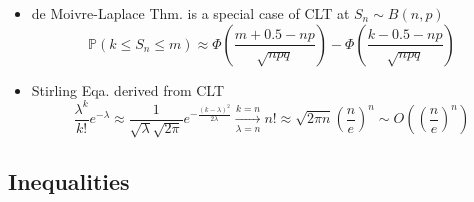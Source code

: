 \begin{itemize}
\begin{proof}
    Define $ Z=\dfrac{X-\mu }{\sigma } $ The taylor series of $ \phi _Z(t) $ at $ t=0 $ yields:
    \begin{align*}
        \phi _Z(t)=1-\dfrac{t^2}{2}+o(t^2) 
    \end{align*}
    The characteristic function of mean $ \displaystyle\bar{Z}:=\dfrac{1}{n}\sum_{i=1}^nZ_i=\dfrac{1}{n}\sum_{i=1}^n\dfrac{X_i-\mu }{\sigma } $ w.r.t. $ X_i $ i.i.d. $ \sim f_X(x) $
    \begin{align*}
        \phi _{\bar{Z}}(t)=\mathbb{E}\left[ e^{it\bar{Z}} \right]=&\left[\phi _{Z}(\dfrac{t}{n})\right]^n=\left[1-\dfrac{t^2}{2n^2}\right] ^n 
    \end{align*}
    with $ n\to\infty $ limit:\footnote{Note: if use characteristic function of $ X_i $ directly, notice that
    \begin{align*}
        n\log\left(1+ \dfrac{at}{n}-\dfrac{bt^2}{2n^2}\right)= at -\left(b+a^2\right)\dfrac{t^2}{2n}+\mathcal{O}(\dfrac{1}{n^2})
    \end{align*}
    using the taylor series of $ \log(1+\xi ) $ at $ \xi =0 $.
    }
    \begin{align*}
        \lim_{n\to\infty}\phi _{\bar{Z}}(t)=&\lim_{n\to\infty} \left[1-\dfrac{1}{n}\dfrac{t^2}{2n}\right] ^n=e^{-\frac{t^2}{2n}} \Rightarrow \bar{Z}=\dfrac{\bar{X}-\mu }{\sigma }\xrightarrow[]{\mathrm{d}} N(0,\dfrac{1}{n})
    \end{align*}

\end{proof}

\item de Moivre-Laplace Thm. is a special case of CLT at $ S_n\sim B (n,p) $
\begin{equation}    \mathbb{P}(k\leq S_n\leq m)\approx \Phi(\frac{m+0.5-np}{\sqrt{npq}})-\Phi(\frac{k-0.5-np}{\sqrt{npq}})
\end{equation}
\item Stirling Eqa. derived from CLT
\begin{equation}    \frac{\lambda^k}{k!}e^{-\lambda}\approx \frac{1}{\sqrt{\lambda}\sqrt{2\pi}}e^{-\frac{(k-\lambda)^2}{2\lambda}}\xrightarrow[\lambda=n]{k=n}n!\approx\sqrt{2\pi n}(\frac{n}{e})^n\sim O\left((\dfrac{n}{e})^n\right)
\end{equation}

\end{itemize}


\subsection{Inequalities}\label{SubSectionUsefulInequality}
    
